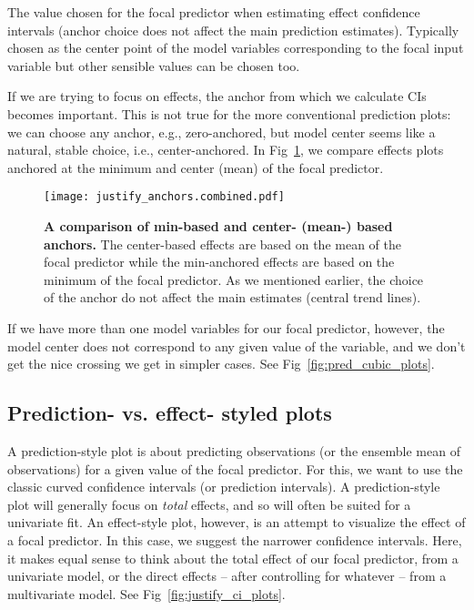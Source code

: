 The value chosen for the focal predictor when estimating effect confidence intervals (anchor choice does not affect the main prediction estimates). Typically chosen as the center point of the model variables corresponding to the focal input variable but other sensible values can be chosen too.

If we are trying to focus on effects, the anchor from which we calculate CIs becomes important. This is not true for the more conventional prediction plots: we can choose any anchor, e.g., zero-anchored, but model center seems like a natural, stable choice, i.e., center-anchored. In Fig~\ref{fig:justify_anchors}, we compare effects plots anchored at the minimum and center (mean) of the focal predictor.

\begin{figure}[!h]
\begin{center}
\texttt{[image: justify\_anchors.combined.pdf]}
\end{center}
\caption{{\bf A comparison of min-based and center- (mean-) based anchors.} The center-based effects are based on the mean of the focal predictor while the min-anchored effects are based on the minimum of the focal predictor. As we mentioned earlier, the choice of the anchor do not affect the main estimates (central trend lines).} 
\label{fig:justify_anchors}
\end{figure}

If we have more than one model variables for our focal predictor, however, the model center does not correspond to any given value of the variable, and we don't get the nice crossing we get in simpler cases. See Fig~\ref{fig:pred_cubic_plots}.


\subsection*{Prediction- vs. effect- styled plots}

A prediction-style plot is about predicting observations (or the ensemble mean of observations) for a given value of the focal predictor. For this, we want to use the classic curved confidence intervals (or prediction intervals). A prediction-style plot will generally focus on \emph{total} effects, and so will often be suited for a univariate fit. An effect-style plot, however, is an attempt to visualize the effect of a focal predictor. In this case, we suggest the narrower confidence intervals. Here, it makes equal sense to think about the total effect of our focal predictor, from a univariate model, or the direct effects – after controlling for whatever – from a multivariate model. See Fig~\ref{fig:justify_ci_plots}.

